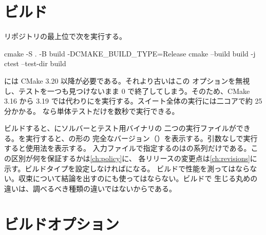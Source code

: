 \section{ビルド}
\label{sec:install:build}

リポジトリの最上位で次を実行する。

\begin{shell}
cmake -S . -B build -DCMAKE_BUILD_TYPE=Release
cmake --build build -j
ctest --test-dir build
\end{shell}

には CMake 3.20 以降が必要である。それより古いはこの
オプションを無視し、テストを一つも見つけないまま 0 で終了してしまう。そのため、CMake 3.16 から
3.19 では代わりにを実行する。スイート全体の実行には二コアで約 25 分かかる。
なら単体テストだけを数秒で実行できる。

ビルドすると、にソルバーとテスト用バイナリの
二つの実行ファイルができる。を実行すると、の形の
完全なバージョン（）を表示する。引数なしで実行すると使用法を表示する。
入力ファイルで指定するのはの系列だけである。この区別が何を保証するかは\cref{ch:policy}に、
各リリースの変更点は\cref{ch:revisions}に示す。ビルドタイプを設定しなければになる。
ビルドで性能を測ってはならない。収束について結論を出すのにも使ってはならない。ビルドで
生じる丸めの違いは、調べるべき種類の違いではないからである。

\section{ビルドオプション}
\label{sec:install:options}

